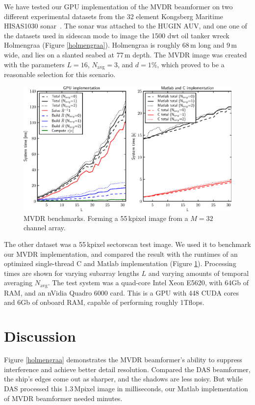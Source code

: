 \documentclass[12pt,journal,captionsoff,onecolumn]{IEEEtran}
\let\MYoriglatexcaption\caption               %
\renewcommand{\caption}[2][\relax]{\MYoriglatexcaption[#2]{#2}}
\newcommand\Fig[1]{Figure \ref{#1}}
\newcommand\1{\vec 1}
\begin{document}
We have tested our \gls{GPU} implementation of the \gls{MVDR} beamformer on two different experimental datasets from the 32 element Kongsberg Maritime HISAS1030 sonar~\cite{Hansen2009}. The sonar was attached to the HUGIN \gls{AUV}, and one one of the datasets used in sidescan mode to image the 1500 dwt oil tanker wreck Holmengraa (\Fig{holmengraa}). Holmengraa is roughly 68\,m long and 9\,m wide, and lies on a slanted seabed at 77\,m depth. The \gls{MVDR} image was created with the parameters $L=16$, $N_\text{avg}=3$, and $d=1\%$, which proved to be a reasonable selection for this scenario.

\begin{figure}[!t]
\centering
\includegraphics[width=\linewidth]{gfx/benchmark.ps}
\caption{\protect\gls{MVDR} benchmarks. Forming a 55\,kpixel image from a $M=32$ channel array.}\label{benchmarks}
\end{figure}

The other dataset was a 55\,kpixel sectorscan test image. We used it to benchmark our \gls{MVDR} implementation, and compared the result with the runtimes of an optimized single-thread C and Matlab implementation (\Fig{benchmarks}). Processing times are shown for varying subarray lengths $L$ and varying amounts of temporal averaging $N_\text{avg}$. The test system was a quad-core Intel Xeon E5620, with 64Gb of \gls{RAM}, and an nVidia Quadro 6000 card. This is a \gls{GPU} with 448 \gls{CUDA} cores and 6Gb of onboard \gls{RAM}, capable of performing roughly 1Tflops.

\section{Discussion}

Figure \ref{holmengraa} demonstrates the \gls{MVDR} beamformer's ability to suppress interference and achieve better detail resolution. Compared the \gls{DAS} beamformer, the ship's edges come out as sharper, and the shadows are less noisy. But while \gls{DAS} processed this 1.3\,Mpixel image in milliseconds, our Matlab implementation of \gls{MVDR} beamformer needed minutes.
\end{document}
